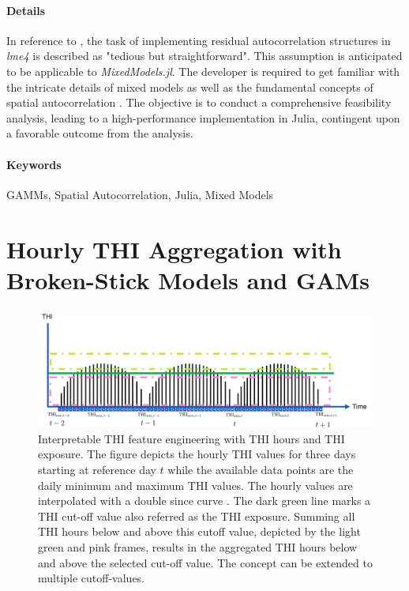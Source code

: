\paragraph{Details} In reference to \cite{bolker_glmmFAQ}, the task of implementing residual autocorrelation structures in \textit{lme4} is described as "tedious but straightforward". This assumption is anticipated to be applicable to \textit{MixedModels.jl}. The developer is required to get familiar with the intricate details of mixed models \cite{bates_fitting_2015} as well as the fundamental concepts of spatial autocorrelation \citep{cressie1991statistics}. The objective is to conduct a comprehensive feasibility analysis, leading to a high-performance implementation in Julia, contingent upon a favorable outcome from the analysis.

\paragraph{Keywords} GAMMs, Spatial Autocorrelation, Julia, Mixed Models

\newpage


\section{Hourly THI Aggregation with Broken-Stick Models and GAMs}
  \begin{figure}[H]
    \centering
    \includegraphics[width=\textwidth]{thesis/figures/thi_load.png}
    \caption[]{Interpretable THI feature engineering with THI hours and THI exposure. The figure depicts the hourly THI values for three days starting at reference day $t$ while the available data points are the daily minimum and maximum THI values. The hourly values are interpolated with a double since curve \citep{bucheli_heat_2022}. The dark green line marks a THI cut-off value also referred as the THI exposure. Summing all THI hours below and above this cutoff value, depicted by the light green and pink frames, results in the aggregated THI hours below and above the selected cut-off value. The concept can be extended to multiple cutoff-values.}
    \label{fig:thi_load}
\end{figure}
